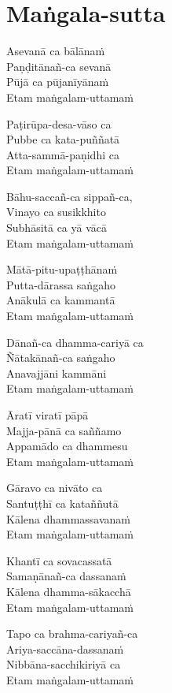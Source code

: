 \clearpage

\chapter{Maṅgala-sutta}%


\begin{paritta}
Asevanā ca bālānaṁ\\
Paṇḍitānañ-ca sevanā\\
Pūjā ca pūjanīyānaṁ\\
Etam maṅgalam-uttamaṁ

Paṭirūpa-desa-vāso ca\\
Pubbe ca kata-puññatā\\
Atta-sammā-paṇidhi ca\\
Etam maṅgalam-uttamaṁ

Bāhu-saccañ-ca sippañ-ca,\\
Vinayo ca susikkhito\\
Subhāsitā ca yā vācā\\
Etam maṅgalam-uttamaṁ

Mātā-pitu-upaṭṭhānaṁ\\
Putta-dārassa saṅgaho\\
Anākulā ca kammantā\\
Etam maṅgalam-uttamaṁ

Dānañ-ca dhamma-cariyā ca\\
Ñātakānañ-ca saṅgaho\\
Anavajjāni kammāni\\
Etam maṅgalam-uttamaṁ

Āratī viratī pāpā\\
Majja-pānā ca saññamo\\
Appamādo ca dhammesu\\
Etam maṅgalam-uttamaṁ

Gāravo ca nivāto ca\\
Santuṭṭhī ca kataññutā\\
Kālena dhammassavanaṁ\\
Etam maṅgalam-uttamaṁ

Khantī ca sovacassatā\\
Samaṇānañ-ca dassanaṁ\\
Kālena dhamma-sākacchā\\
Etam maṅgalam-uttamaṁ

Tapo ca brahma-cariyañ-ca\\
Ariya-saccāna-dassanaṁ\\
Nibbāna-sacchikiriyā ca\\
Etam maṅgalam-uttamaṁ


\end{paritta}
